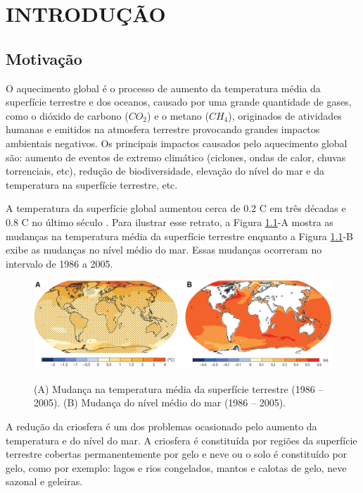 
\chapter{INTRODUÇÃO}
\label{chap:introducao}

\section{Motivação}
\label{sec:motivacao}

O aquecimento global é o processo de aumento da temperatura média da superfície terrestre e dos oceanos, causado por uma grande quantidade de gases, como o dióxido de carbono ($CO_2$) e o metano ($CH_4$), originados de atividades humanas e emitidos na atmosfera terrestre provocando grandes impactos ambientais negativos. Os principais impactos causados pelo aquecimento global são: aumento de eventos de extremo climático (ciclones, ondas de calor, chuvas torrenciais, etc), redução de biodiversidade, elevação do nível do mar e da temperatura na superfície terrestre, etc. 

A temperatura da superfície global aumentou cerca de 0.2 \textordmasculine C em três décadas e 0.8 \textordmasculine C no último século \cite{hansen2006global}. Para ilustrar esse retrato, a Figura \ref{fig:ast-and-sl}-A mostra as mudanças na temperatura média da superfície terrestre enquanto a Figura \ref{fig:ast-and-sl}-B exibe as mudanças no nível médio do mar. Essas mudanças ocorreram no intervalo de 1986 a 2005.

\begin{figure}[H]
    \centering
    \caption{(A) Mudança na temperatura média da superfície terrestre (1986 -- 2005). (B) Mudança do nível médio do mar (1986 -- 2005).}
    \includegraphics[scale=0.27]{dados/figuras/ast-and-sl.png}
    \label{fig:ast-and-sl}
\end{figure}

A redução da criosfera é um dos problemas ocasionado pelo aumento da temperatura e do nível do mar. A criosfera é constituída por regiões da superfície terrestre cobertas permanentemente por gelo e neve ou o solo é constituído por gelo, como por exemplo: lagos e rios congelados, mantos e calotas de gelo, neve sazonal e geleiras.

